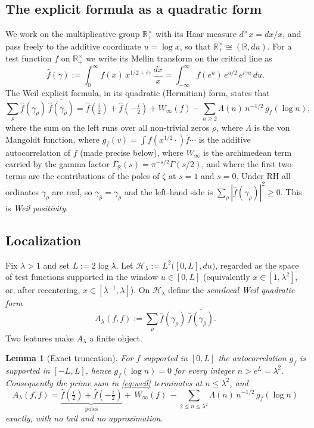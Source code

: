 \documentclass[11pt]{amsart}
\newtheorem{lemma}[theorem]{Lemma}
\theoremstyle{definition}
\theoremstyle{remark}
\newcommand{\R}{\mathbb{R}}
\newcommand{\lam}{\lambda}
\begin{document}
\subsection{The explicit formula as a quadratic form}
We work on the multiplicative group $\R_+^\times$ with its Haar measure $d^\times x=dx/x$, and pass freely to the additive coordinate $u=\log x$, so that $\R_+^\times\cong(\R,du)$. For a test function $f$ on $\R_+^\times$ we write its Mellin transform on the critical line as
\[
\widehat f(\gamma):=\int_0^\infty f(x)\,x^{1/2+i\gamma}\,\frac{dx}{x}=\int_{-\infty}^\infty f(e^u)\,e^{u/2}\,e^{i\gamma u}\,du .
\]
The Weil explicit formula, in its quadratic (Hermitian) form, states that
\begin{equation}\label{eq:weil}
\sum_{\rho}\widehat f(\gamma_\rho)\,\overline{\widehat f(\gamma_{\bar\rho})}
=\widehat f\!\left(\tfrac{i}{2}\right)\!+\widehat f\!\left(-\tfrac{i}{2}\right)
+W_\infty(f)-\sum_{n\ge 2}\Lambda(n)\,n^{-1/2}\,g_f(\log n),
\end{equation}
where the sum on the left runs over all non-trivial zeros $\rho$, where $\Lambda$ is the von Mangoldt function, where $g_f(v)=\int f(x^{1/2}\cdot)\overline{f}\cdots$ is the additive autocorrelation of $f$ (made precise below), where $W_\infty$ is the archimedean term carried by the gamma factor $\Gamma_\R(s)=\pi^{-s/2}\Gamma(s/2)$, and where the first two terms are the contributions of the poles of $\zeta$ at $s=1$ and $s=0$. Under RH all ordinates $\gamma_\rho$ are real, so $\gamma_{\bar\rho}=\gamma_\rho$ and the left-hand side is $\sum_\rho|\widehat f(\gamma_\rho)|^2\ge 0$. This is \emph{Weil positivity}.

\subsection{Localization}
Fix $\lam>1$ and set $L:=2\log\lam$. Let $\mathcal H_\lam:=L^2\big([0,L],du\big)$, regarded as the space of test functions supported in the window $u\in[0,L]$ (equivalently $x\in[1,\lam^2]$, or, after recentering, $x\in[\lam^{-1},\lam]$). On $\mathcal H_\lam$ define the \emph{semilocal Weil quadratic form}
\[
A_\lam(f,f):=\sum_\rho \widehat f(\gamma_\rho)\,\overline{\widehat f(\gamma_{\bar\rho})}.
\]
Two features make $A_\lam$ a finite object.

\begin{lemma}[Exact truncation]\label{lem:exact}
For $f$ supported in $[0,L]$ the autocorrelation $g_f$ is supported in $[-L,L]$, hence $g_f(\log n)=0$ for every integer $n>e^{L}=\lam^2$. Consequently the prime sum in \eqref{eq:weil} terminates at $n\le\lam^2$, and
\[
A_\lam(f,f)=\underbrace{\widehat f(\tfrac i2)+\widehat f(-\tfrac i2)}_{\text{poles}}+\,W_\infty(f)\,-\sum_{2\le n\le \lam^2}\Lambda(n)\,n^{-1/2}\,g_f(\log n)
\]
\emph{exactly}, with no tail and no approximation.
\end{lemma}
\end{document}
